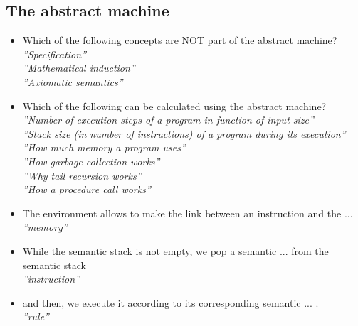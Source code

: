 \documentclass[fr,license=none]{../../../eplsummary}
\begin{document}
		\subsection{The abstract machine}
			\begin{itemize}
				\item Which of the following concepts are NOT part of the abstract machine?\\
					\textit{''Specification''}\\
					\textit{''Mathematical induction''}\\
					\textit{''Axiomatic semantics''}
				\item Which of the following can be calculated using the abstract machine?\\
					\textit{''Number of execution steps of a program in function of input size''}\\
					\textit{''Stack size (in number of instructions) of a program during its execution''}\\
					\textit{''How much memory a program uses''}\\
					\textit{''How garbage collection works''}\\
					\textit{''Why tail recursion works''}\\
					\textit{''How a procedure call works''}
				\item The environment allows to make the link between an instruction and the ...\\
					\textit{''memory''}
				\item While the semantic stack is not empty, we pop a semantic ... from the semantic stack\\
					\textit{''instruction''}
				\item and then, we execute it according to its corresponding semantic ... .\\
					\textit{''rule''}
			\end{itemize}
\end{document}
